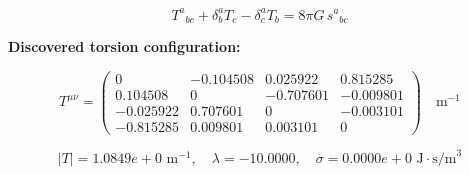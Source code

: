 
\begin{equation}
  T^a{}_{bc} + \delta^a_b T_c - \delta^a_c T_b = 8\pi G \, s^a{}_{bc}
\end{equation}

\textbf{Discovered torsion configuration:}

\begin{equation}
  T^{\mu\nu} = \begin{pmatrix}
    0 & -0.104508 & 0.025922 & 0.815285 \\
    0.104508 & 0 & -0.707601 & -0.009801 \\
    -0.025922 & 0.707601 & 0 & -0.003101 \\
    -0.815285 & 0.009801 & 0.003101 & 0
  \end{pmatrix} \quad \text{m}^{-1}
\end{equation}

\begin{equation}
  |T| = 1.0849e+0 \text{ m}^{-1}, \quad
  \lambda = -10.0000, \quad
  \sigma = 0.0000e+0 \text{ J}\cdot\text{s/m}^3
\end{equation}